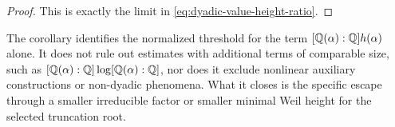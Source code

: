 \begin{proof}
This is exactly the limit in
\eqref{eq:dyadic-value-height-ratio}.
\end{proof}

\begin{remark}
The corollary identifies the normalized threshold for the term
\([\mathbb Q(\alpha):\mathbb Q]h(\alpha)\) alone.  It does not rule out estimates with
additional terms of comparable size, such as
\([\mathbb Q(\alpha):\mathbb Q]\log[\mathbb Q(\alpha):\mathbb Q]\), nor does it exclude nonlinear
auxiliary constructions or non-dyadic phenomena.  What it closes is the
specific escape through a smaller irreducible factor or smaller minimal
Weil height for the selected truncation root.
\end{remark}
